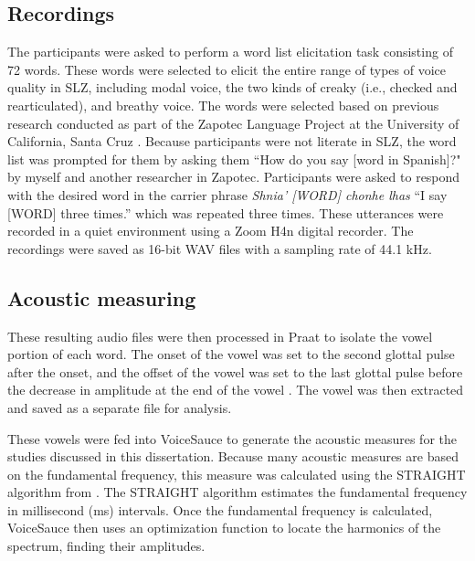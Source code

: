 \subsection{Recordings} \label{sec:acousticlandscape:recordings} 
The participants were asked to perform a word list elicitation task consisting of 72 words. These words were selected to elicit the entire range of types of voice quality in SLZ, including modal voice, the two kinds of creaky (i.e., checked and rearticulated), and breathy voice. The words were selected based on previous research conducted as part of the Zapotec Language Project at the University of California, Santa Cruz \citep{ZapotecLanguageProject}. 
Because participants were not literate in SLZ, the word list was prompted for them by asking them ``How do you say [word in Spanish]?" by myself and another researcher in Zapotec. Participants were asked to respond with the desired word in the carrier phrase \textit{Shnia' [WORD] chonhe lhas} ``I say [WORD] three times.'' which was repeated three times. These utterances were recorded in a quiet environment using a Zoom H4n digital recorder. The recordings were saved as 16-bit WAV files with a sampling rate of 44.1 kHz.

\subsection{Acoustic measuring} \label{sec:acousticlandscape:analysis}
These resulting audio files were then processed in Praat to isolate the vowel portion of each word. The onset of the vowel was set to the second glottal pulse after the onset, and the offset of the vowel was set to the last glottal pulse before the decrease in amplitude at the end of the vowel \citep{garellekAcousticDiscriminabilityComplex2020}. The vowel was then extracted and saved as a separate file for analysis.

These vowels were fed into VoiceSauce \citep{shueVOICESAUCEProgramVoice2009} to generate the acoustic measures for the studies discussed in this dissertation. Because many acoustic measures are based on the fundamental frequency, this measure was calculated using the STRAIGHT algorithm from \citep{kawaharaInstantaneousfrequencybasedPitchExtraction1998}. The STRAIGHT algorithm estimates the fundamental frequency in millisecond (ms) intervals. Once the fundamental frequency is calculated, VoiceSauce then uses an optimization function to locate the harmonics of the spectrum, finding their amplitudes.

